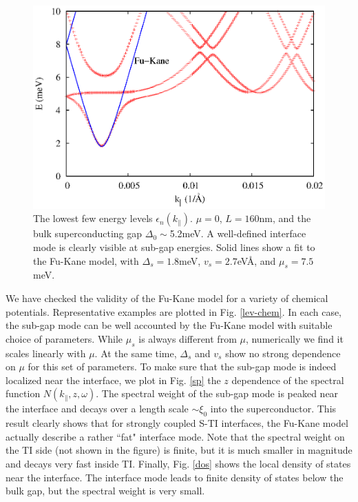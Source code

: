 \begin{figure}
\center
\includegraphics[width=\textwidth]{include/levels.eps}
\caption{The lowest few energy levels $\epsilon_n(k_\parallel)$. 
$\mu=0$, $L=160$nm, and the bulk superconducting gap $\Delta_0\sim$5.2meV.
A well-defined interface mode is clearly visible at sub-gap energies.
Solid lines show a fit to the Fu-Kane model, with $\Delta_s=1.8$meV, 
$v_s=2.7$eV\AA, and $\mu_s=7.5$meV.
}\label{lev-fk}
\end{figure}

We have checked the validity of the Fu-Kane model for a variety of chemical potentials.
Representative examples are plotted in Fig. \ref{lev-chem}. In each case, the sub-gap 
mode can be well accounted by the Fu-Kane 
model with suitable choice of parameters. While $\mu_s$ is always different from $\mu$,
numerically we find it scales linearly with $\mu$. At the same time, 
$\Delta_s$ and $v_s$ show no strong dependence on $\mu$ for this set of parameters.
To make sure that the sub-gap mode is indeed localized near the interface, we plot in 
Fig. \ref{sp} the $z$ dependence of the spectral function $N(k_\parallel,z,\omega)$.
%
The spectral weight of the sub-gap mode is peaked near the interface and decays over 
a length scale $\sim \xi_0$ into the superconductor. This result clearly shows
that for strongly coupled S-TI interfaces, the Fu-Kane model actually describe a
rather ``fat" interface mode. Note that the spectral weight on the TI side 
(not shown in the figure) is finite, 
but it is much smaller in magnitude and decays very fast inside TI. Finally,
Fig. \ref{dos} shows the local density of states near the interface.
The interface mode leads to finite density of states below the bulk gap,
but the spectral weight is very small.

